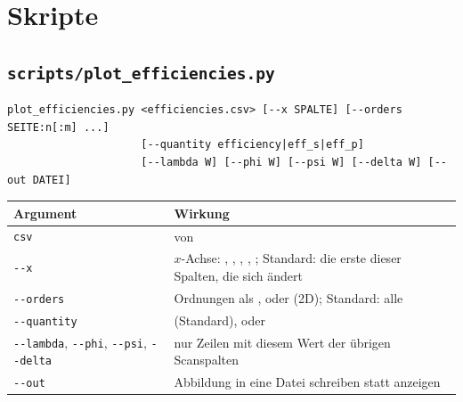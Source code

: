 \section{Skripte}\label{sec:ref-skripte}
\subsection*{\texttt{scripts/plot\_efficiencies.py}}
\begin{lstlisting}[style=shell]
plot_efficiencies.py <efficiencies.csv> [--x SPALTE] [--orders SEITE:n[:m] ...]
                     [--quantity efficiency|eff_s|eff_p]
                     [--lambda W] [--phi W] [--psi W] [--delta W] [--out DATEI]
\end{lstlisting}
\begin{center}
\small
\begin{tabularx}{\linewidth}{lY}
\toprule
Argument & Wirkung \\
\midrule
\texttt{csv} &  von  \\
\texttt{-{}-x} & $x$-Achse: , , , , ;
Standard: die erste dieser Spalten, die sich ändert \\
\texttt{-{}-orders} & Ordnungen als ,  oder  (2D); Standard: alle \\
\texttt{-{}-quantity} &  (Standard),  oder  \\
\texttt{-{}-lambda}, \texttt{-{}-phi}, \texttt{-{}-psi}, \texttt{-{}-delta} & nur Zeilen mit diesem Wert der übrigen
Scanspalten \\
\texttt{-{}-out} & Abbildung in eine Datei schreiben statt anzeigen \\
\bottomrule
\end{tabularx}
\end{center}

